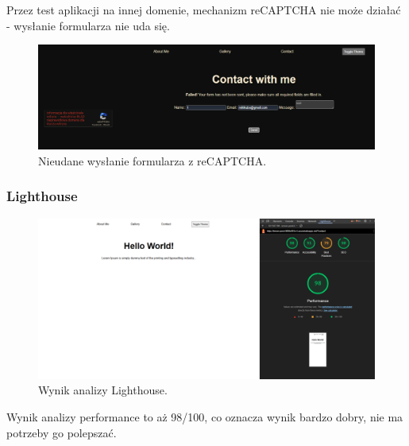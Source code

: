 \documentclass[a4paper,12pt]{article}
\begin{document}
Przez test aplikacji na innej domenie, mechanizm reCAPTCHA nie może działać - wysłanie formularza nie uda się.

\begin{figure}[H]
    \centering
    \includegraphics[width=1\textwidth]{images/contact_failure.png}
    \caption{Nieudane wysłanie formularza z reCAPTCHA.}
\end{figure}

\subsubsection{Lighthouse}

\begin{figure}[H]
    \centering
    \includegraphics[width=1\textwidth]{images/lighthouse.png}
    \caption{Wynik analizy Lighthouse.}
\end{figure}

Wynik analizy performance to aż 98/100, co oznacza wynik bardzo dobry, nie ma potrzeby go polepszać.
\end{document}
